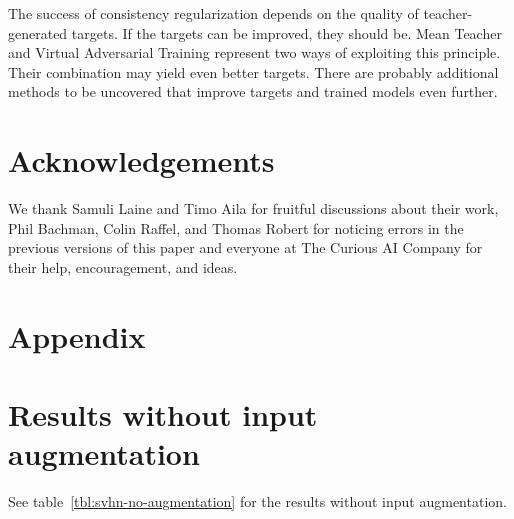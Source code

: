 \documentclass{article}
\begin{document}
The success of consistency regularization depends on the quality of teacher-generated targets.
If the targets can be improved, they should be.
Mean Teacher and Virtual Adversarial Training represent two ways of exploiting this principle.
Their combination may yield even better targets.
There are probably additional methods to be uncovered that improve targets and trained models even further.

\section*{Acknowledgements}

We thank Samuli Laine and Timo Aila for fruitful discussions about their work, Phil Bachman, Colin Raffel, and Thomas Robert for noticing errors in the previous versions of this paper and everyone at The Curious AI Company for their help, encouragement, and ideas.




\clearpage

\appendix

\section*{Appendix}

\section{Results without input augmentation}

See table~\ref{tbl:svhn-no-augmentation} for the results without input augmentation.
\end{document}
